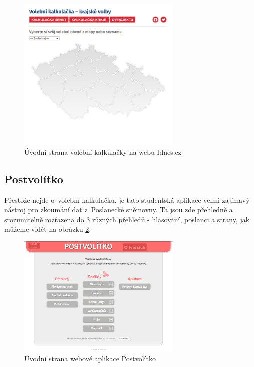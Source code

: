 \begin{figure}
    \centering
    \includegraphics[width=0.7\textwidth]{obrazky-figures/idnes-uvod.png}
    \caption{Úvodní strana volební kalkulačky na webu Idnes.cz}
    \label{fig:idnes-uvod}
\end{figure}

\subsection{Postvolítko}
Přestože nejde o~volební kalkulačku, je tato studentská aplikace velmi zajímavý nástroj pro zkoumání dat z~Poslanecké sněmovny. Ta jsou zde přehledně a srozumitelně rozřazena do 3 různých přehledů - hlasování, poslanci a strany, jak můžeme vidět na obrázku \ref{fig:postvolitko-uvod}.

\begin{figure}
    \centering
    \includegraphics[width=0.7\textwidth]{obrazky-figures/postvolitko-uvod.png}
    \caption{Úvodní strana webové aplikace Postvolítko}
    \label{fig:postvolitko-uvod}
\end{figure}


